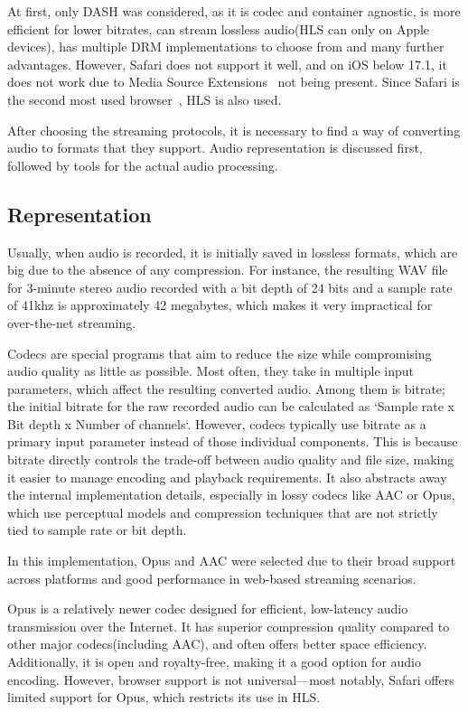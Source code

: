 At first, only DASH was considered, as it is codec and container agnostic,
is more efficient for lower bitrates, can stream lossless audio(HLS can only on Apple devices),
has multiple DRM implementations to choose from and many further advantages.
However, Safari does not support it well, and on iOS below 17.1, it does not work due to
Media Source Extensions~\cite{mse,msecaniuse} not being present.
Since Safari is the second most used browser~\cite{browserusage}, HLS is also used.

After choosing the streaming protocols, it is necessary to find a way of converting audio to formats that
they support. Audio representation is discussed first, followed by tools for the actual audio processing.

\subsection{Representation}
Usually, when audio is recorded, it is initially saved in lossless formats, which are big due to
the absence of any compression. For instance, the resulting WAV file for 3-minute stereo audio
recorded with a bit depth of 24 bits and a sample rate of 41khz is approximately 42 megabytes, which makes
it very impractical for over-the-net streaming.

Codecs are special programs that aim to reduce the size
while compromising audio quality as little as possible. Most often, they take in multiple input parameters, which affect the resulting converted audio. Among them is bitrate; the initial bitrate for the raw recorded audio
can be calculated as `Sample rate x Bit depth x Number of channels`.
However, codecs typically use bitrate as a primary input parameter instead of those individual components.
This is because bitrate directly controls the trade-off between audio quality and file size,
making it easier to manage encoding and playback requirements.
It also abstracts away the internal implementation details, especially in lossy codecs like AAC or Opus,
which use perceptual models and compression techniques that are not strictly tied to sample rate or bit depth.

In this implementation, Opus and AAC were selected due to their broad support across platforms and
good performance in web-based streaming scenarios.

Opus is a relatively newer codec designed for efficient, low-latency audio transmission over the Internet.
It has superior compression quality compared to other major codecs(including AAC)\cite{opusefficiency},
and often offers better space efficiency.
Additionally, it is open and royalty-free, making it a good option for audio encoding.
However, browser support is not universal—most notably, Safari offers limited support for Opus\cite{caniuseopus},
which restricts its use in HLS.

